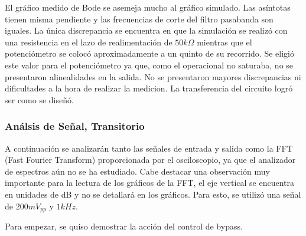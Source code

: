 El gráfico medido de Bode se asemeja mucho al gráfico simulado. Las asíntotas tienen misma pendiente y las frecuencias de corte del filtro pasabanda son iguales. La única discrepancia se encuentra en que la simulación se realizó con una resistencia en el lazo de realimentación de $50k\Omega$ mientras que el potenciómetro se colocó aproximadamente a un quinto de su recorrido. Se eligió este valor para el potenciómetro ya que, como el operacional no saturaba, no se presentaron alinealidades en la salida. No se presentaron mayores discrepancias ni dificultades a la hora de realizar la medicion. La transferencia del circuito logró ser como se diseñó.

\subsubsection{Análsis de Señal, Transitorio}

A continuación se analizarán tanto las señales de entrada y salida como la FFT (Fast Fourier Transform) proporcionada por el osciloscopio, ya que el analizador de espectros aún no se ha estudiado. Cabe destacar una observación muy importante para la lectura de los gráficos de la FFT, el eje vertical se encuentra en unidades de dB y no se detallará en los gráficos. Para esto, se utilizó una señal de $200mV_{pp}$ y $1kHz$.

Para empezar, se quiso demostrar la acción del control de bypass.

